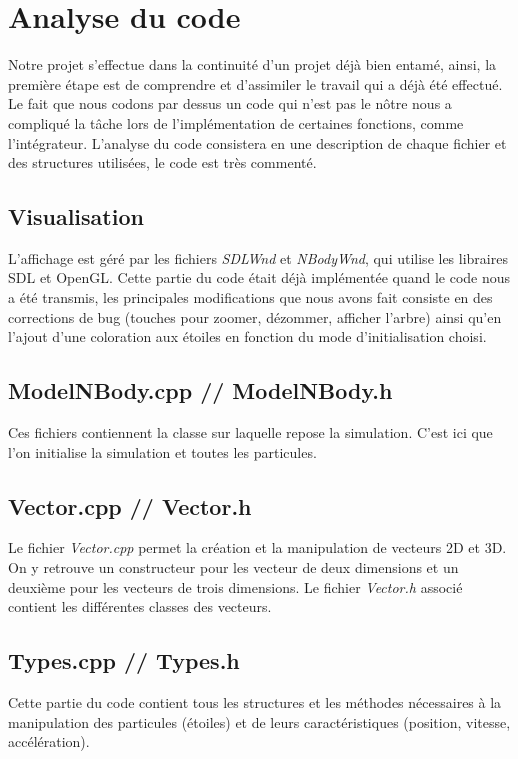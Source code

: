 \chapter{Analyse du code}

Notre projet s'effectue dans la continuité d'un projet déjà bien entamé, ainsi, la première étape est de comprendre et d'assimiler le travail qui a déjà été effectué. Le fait que nous codons par dessus un code qui n'est pas le nôtre nous a compliqué la tâche lors de l'implémentation de certaines fonctions, comme l'intégrateur. L'analyse du code consistera en une description de chaque fichier et des structures utilisées, le code est très commenté.

\section{Visualisation}
L'affichage est géré par les fichiers \textit{SDLWnd} et \textit{NBodyWnd}, qui utilise les libraires SDL et OpenGL. Cette partie du code était déjà implémentée quand le code nous a été transmis, les principales modifications que nous avons fait consiste en des corrections de bug (touches pour zoomer, dézommer, afficher l'arbre) ainsi qu'en l'ajout d'une coloration aux étoiles en fonction du mode d'initialisation choisi.

\section{ModelNBody.cpp // ModelNBody.h}
Ces fichiers contiennent la classe sur laquelle repose la simulation. C'est ici que l'on initialise la simulation et toutes les particules.

\section{Vector.cpp // Vector.h}
Le fichier \textit{Vector.cpp} permet la création et la manipulation de vecteurs 2D et 3D. On y retrouve un constructeur pour les vecteur de deux dimensions et un deuxième pour les vecteurs de trois dimensions. Le fichier \textit{Vector.h} associé contient les différentes classes des vecteurs.

\section{Types.cpp // Types.h}
Cette partie du code contient tous les structures et les méthodes nécessaires à la manipulation des particules (étoiles) et de leurs caractéristiques (position, vitesse, accélération).

